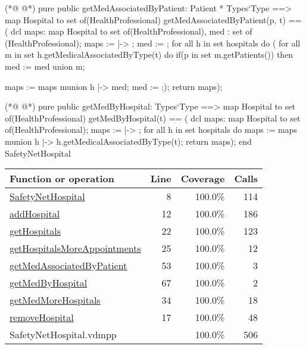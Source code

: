 \begin{vdmpp}[breaklines=true]
(*@
\label{getMedAssociatedByPatient:53}
@*)
 pure public getMedAssociatedByPatient: Patient * Types`Type ==> map Hospital to set of(HealthProfessional)
  getMedAssociatedByPatient(p, t) == (
                     dcl maps: map Hospital to set of(HealthProfessional), med : set of (HealthProfessional);
                     maps := { |-> };
                     med := {};
                     for all h in set hospitals do (
                      for all m in set h.getMedicalAssociatedByType(t) do
                       if(p in set m.getPatients())
                        then med := med union {m};
                       
                      maps := maps munion {h |-> med};
                      med := {};);
                      return maps);
 
(*@
\label{getMedByHospital:67}
@*)
 pure public getMedByHospital: Types`Type ==> map Hospital to set of(HealthProfessional)
  getMedByHospital(t) == (
                     dcl maps: map Hospital to set of(HealthProfessional);
                     maps := { |-> };
                     for all h in set hospitals do
                      maps := maps munion {h |-> h.getMedicalAssociatedByType(t)};
                     return maps);
end SafetyNetHospital
\end{vdmpp}
\bigskip
\begin{longtable}{|l|r|r|r|}
\hline
Function or operation & Line & Coverage & Calls \\
\hline
\hline
\hyperref[SafetyNetHospital:8]{SafetyNetHospital} & 8&100.0\% & 114 \\
\hline
\hyperref[addHospital:12]{addHospital} & 12&100.0\% & 186 \\
\hline
\hyperref[getHospitals:22]{getHospitals} & 22&100.0\% & 123 \\
\hline
\hyperref[getHospitalsMoreAppointments:25]{getHospitalsMoreAppointments} & 25&100.0\% & 12 \\
\hline
\hyperref[getMedAssociatedByPatient:53]{getMedAssociatedByPatient} & 53&100.0\% & 3 \\
\hline
\hyperref[getMedByHospital:67]{getMedByHospital} & 67&100.0\% & 2 \\
\hline
\hyperref[getMedMoreHospitals:34]{getMedMoreHospitals} & 34&100.0\% & 18 \\
\hline
\hyperref[removeHospital:17]{removeHospital} & 17&100.0\% & 48 \\
\hline
\hline
SafetyNetHospital.vdmpp & & 100.0\% & 506 \\
\hline
\end{longtable}


